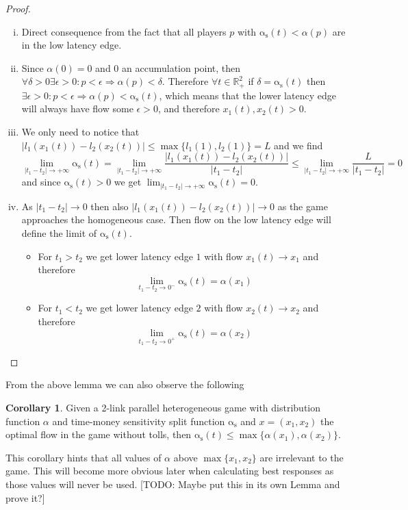 \documentclass[10pt,a4paper]{book}
\newcommand{\as}{\mathrm{\alpha_s}}
\newcommand{\R}{\mathbb{R}}
\theoremstyle{definition}
\newtheorem{corollary}[definition]{Corollary}
\theoremstyle{comment}
\begin{document}
\begin{proof}
	$ $
	\begin{enumerate}[(i)]
		\item Direct consequence from the fact that all players $p$ with $\as(t) < \alpha(p)$ are in the low latency edge.
		\item Since $\alpha(0) = 0$ and $0$ an accumulation point, then $\forall \delta > 0 \exists \epsilon > 0: p < \epsilon \Rightarrow \alpha(p) < \delta$.
		Therefore $\forall t \in \R_+^2$ if $\delta = \as(t)$ then $\exists \epsilon > 0: p < \epsilon \Rightarrow \alpha(p) < \as(t)$, which means that the lower latency edge will always have flow some $\epsilon > 0$, and therefore $x_1(t), x_2(t) > 0$.
		\item We only need to notice that $|l_1(x_1(t)) - l_2(x_2(t))| \le \max\{l_1(1), l_2(1)\} = L$ and we find
		\[\lim_{|t_1 - t_2| \rightarrow +\infty}\as(t) = \lim_{|t_1 - t_2| \rightarrow +\infty}\frac{|l_1(x_1(t)) - l_2(x_2(t))|}{|t_1 - t_2|} \le \lim_{|t_1 - t_2| \rightarrow +\infty}\frac{L}{|t_1 - t_2|} = 0\]
		and since $\as(t) > 0$ we get $\lim_{|t_1 - t_2| \rightarrow +\infty}\as(t) = 0$.
		\item As $|t_1 - t_2| \rightarrow 0$ then also $|l_1(x_1(t)) - l_2(x_2(t))| \rightarrow 0$ as the game approaches the homogeneous case.
		Then flow on the low latency edge will define the limit of $\as(t)$.
			\begin{itemize}
				\item For $t_1 > t_2$ we get lower latency edge $1$ with flow $x_1(t) \rightarrow x_1$ and therefore
				\[\lim_{t_1 - t_2 \rightarrow 0^-} \as(t) = \alpha(x_1)\]
				\item For $t_1 < t_2$ we get lower latency edge $2$ with flow $x_2(t) \rightarrow x_2$ and therefore
				\[\lim_{t_1 - t_2 \rightarrow 0^+} \as(t) = \alpha(x_2)\]
			\end{itemize}
	\end{enumerate}
\end{proof}

From the above lemma we can also observe the following

\begin{corollary}
	Given a 2-link parallel heterogeneous game with distribution function $\alpha$ and time-money sensitivity split function $\as$ and $x = (x_1, x_2)$ the optimal flow in the game without tolls, then $\as(t) \le \max\{\alpha(x_1), \alpha(x_2)\}$.
\end{corollary}

This corollary hints that all values of $\alpha$ above $\max\{x_1, x_2\}$ are irrelevant to the game.
This will become more obvious later when calculating best responses as those values will never be used.
[TODO: Maybe put this in its own Lemma and prove it?]
\end{document}
